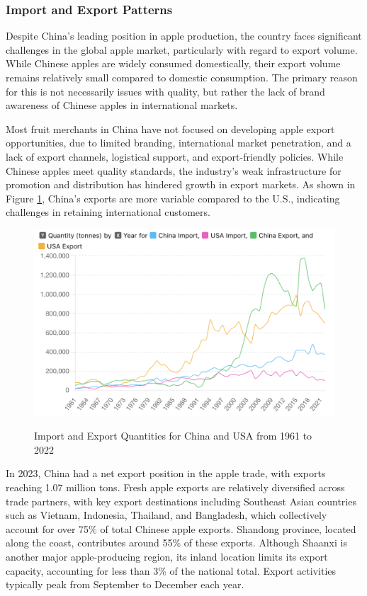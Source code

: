\subsubsection{Import and Export Patterns}
\noindent Despite China's leading position in apple production, the country faces significant challenges in the global apple market, particularly with regard to export volume. While Chinese apples are widely consumed domestically, their export volume remains relatively small compared to domestic consumption. The primary reason for this is not necessarily issues with quality, but rather the lack of brand awareness of Chinese apples in international markets. 

Most fruit merchants in China have not focused on developing apple export opportunities, due to limited branding, international market penetration, and a lack of export channels, logistical support, and export-friendly policies. While Chinese apples meet quality standards, the industry's weak infrastructure for promotion and distribution has hindered growth in export markets. As shown in Figure \ref{fig: import export}, China's exports are more variable compared to the U.S., indicating challenges in retaining international customers.

\begin{figure}[hpt]
    \centering
        \caption{Import and Export Quantities for China and USA from 1961 to 2022}
    \includegraphics[width=\linewidth]{figures/import_export.png}
    \label{fig: import export}
\end{figure}

In 2023, China had a net export position in the apple trade, with exports reaching 1.07 million tons. Fresh apple exports are relatively diversified across trade partners, with key export destinations including Southeast Asian countries such as Vietnam, Indonesia, Thailand, and Bangladesh, which collectively account for over 75\% of total Chinese apple exports. Shandong province, located along the coast, contributes around 55\% of these exports. Although Shaanxi is another major apple-producing region, its inland location limits its export capacity, accounting for less than 3\% of the national total. Export activities typically peak from September to December each year.

